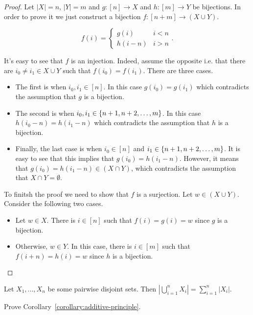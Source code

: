 \begin{proof}
  Let $|X| = n$, $|Y| = m$ and $g : [n] \to X$ and $h : [m] \to Y$ be
  bijections. In order to prove it we just construct a bijection
  $f : [n + m] \to (X \cup Y)$.

  \[
    f(i) =
    \begin{cases}
        g(i) & i < n \\
        h(i  - n) & i > n
    \end{cases}.
  \]

  It's easy to see that $f$ is an injection. Indeed, assume the opposite i.e.
  that there are $i_0 \neq i_1 \in X \cup Y$ such that $f(i_0) = f(i_1)$.
  There are three cases.
  \begin{itemize}
    \item The first is when $i_0, i_1 \in [n]$. In this case $g(i_0) = g(i_1)$
      which contradicts the assumption that $g$ is a bijection.
    \item The second is when $i_0, i_1 \in \set{n + 1, n + 2, \dots, m}$.
      In this case $h(i_0 - n) = h(i_1 - n)$ which contradicts the assumption
      that $h$ is a bijection.
    \item Finally, the last case is when $i_0 \in [n]$ and
      $i_1 \in \set{n + 1, n + 2, \dots, m}$. It is easy to see that this
      implies that $g(i_0) = h(i_1 - n)$. However, it
      means that $g(i_0) = h(i_1 - n) \in (X \cap Y)$, which contradicts the
      assumption that $X \cap Y = \emptyset$.
  \end{itemize}

  To finitsh the proof we need to show that $f$ is a surjection. Let
  $w \in (X \cup Y)$. Consider the following two cases.
  \begin{itemize}
    \item Let $w \in X$. There is $i \in [n]$ such that $f(i) = g(i) = w$ since
      $g$ is a bijection.
    \item Otherwise, $w \in Y$. In this case, there is $i \in [m]$ such that
      $f(i + n) = h(i) = w$ since $h$ is a bijection.
  \end{itemize}
\end{proof}

\begin{corollary}
\label{corollary:additive-principle}
  Let $X_1, \dots, X_n$ be some pairwise disjoint sets. Then
  $\left|\bigcup_{i = 1}^n X_i\right| = \sum_{i = 1}^n |X_i|$.
\end{corollary}

\begin{exercise}
  Prove Corollary~\ref{corollary:additive-principle}.
\end{exercise}


